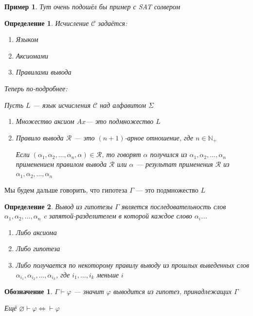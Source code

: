 \documentclass[12pt]{article}
\newtheorem{definition}{Определение}
\newtheorem{example}{Пример}
\newtheorem{notation}{Обозначение}
\begin{document}
\begin{example}
	Тут очень подошёл бы пример с SAT солвером
\end{example}

\begin{definition}
	Исчисление $\mathcal{C}$ задаётся:
	\begin{enumerate}
		\item Языком
		\item Аксиомами
		\item Правилами вывода
	\end{enumerate}
	Теперь по-подробнее:

	Пусть $L$ --- язык исчисления $\mathcal{C}$ над алфавитом $\Sigma$
	\begin{enumerate}
		\item Множество аксиом $Ax$--- это подмножество $L$
		\item
		      Правило вывода $\mathcal{R}$ --- это $(n + 1)$-арное отношение, где $n \in \mathbb{N}_+$

		      Если $(\alpha_1, \alpha_2, ..., \alpha_n, \alpha) \in \mathcal{R}$, то говорят $\alpha$ получился из $\alpha_1, \alpha_2, ..., \alpha_n$ применением правилом вывода $\mathcal{R}$ или $\alpha$ --- результат применения $\mathcal{R}$ из $\alpha_1, \alpha_2, ..., \alpha_n$

	\end{enumerate}
\end{definition}

Мы будем дальше говорить, что гипотеза $\Gamma$ --- это подмножество $L$

\begin{definition}
	Вывод из гипотезы $\Gamma$ является последовательность слов $\alpha_1, \alpha_2, ..., \alpha_n$ c запятой-разделителем в которой каждое слово $\alpha_i$...
	\begin{enumerate}
		\item Либо аксиома
		\item Либо гипотеза
		\item Либо получается по некоторому правилу выводу из прошлых выведенных слов $\alpha_{i_1}, \alpha_{i_2}, ..., \alpha_{i_k}$, где $i_1, ..., i_k $ меньше $i$
	\end{enumerate}

\end{definition}

\begin{notation}
	$\Gamma \vdash \varphi$ --- значит $\varphi$ выводится из гипотез, принадлежащих $\Gamma$

	Ещё $\varnothing \vdash \varphi \iff \vdash \varphi$
\end{notation}
\end{document}
